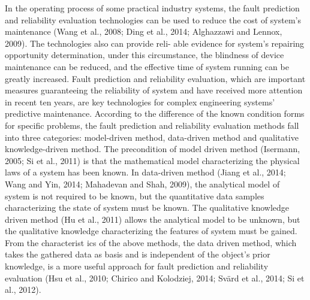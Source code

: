 \documentclass[review]{elsarticle}
\begin{document}
In the operating process of some practical industry systems, the fault
prediction and reliability evaluation technologies can be used to reduce
the cost of system’s maintenance (Wang et al., 2008; Ding et al., 2014;
Alghazzawi and Lennox, 2009). The technologies also can provide reli-
able evidence for system’s repairing opportunity determination, under
this circumstance, the blindness of device maintenance can be reduced,
and the effective time of system running can be greatly increased. Fault
prediction and reliability evaluation, which are important measures
guaranteeing the reliability of system and have received more attention
in recent ten years, are key technologies for complex engineering
systems’ predictive maintenance. According to the difference of the
known condition forms for specific problems, the fault prediction and
reliability evaluation methods fall into three categories: model-driven
method, data-driven method and qualitative knowledge-driven method.
The precondition of model driven method (Isermann, 2005; Si et al.,
2011) is that the mathematical model characterizing the physical laws
of a system has been known. In data-driven method (Jiang et al., 2014;
Wang and Yin, 2014; Mahadevan and Shah, 2009), the analytical model
of system is not required to be known, but the quantitative data samples
characterizing the state of system must be known. The qualitative
knowledge driven method  (Hu et al., 2011) allows the analytical
model to be unknown, but the qualitative knowledge characterizing
the features of system must be gained. From the characterist ics of the
above methods, the data driven method, which takes the gathered data
as basis and is independent of the object’s prior knowledge, is a more
useful approach for fault prediction and reliability evaluation (Hsu et
al., 2010; Chirico and Kolodziej, 2014; Svärd et al., 2014; Si et al., 2012).
\end{document}
